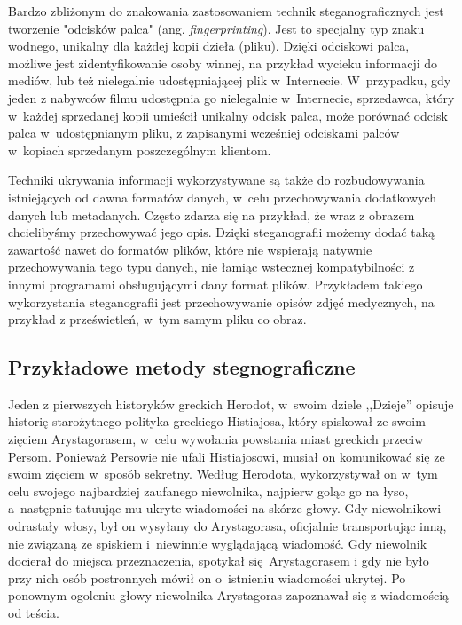\documentclass[a4paper, twoside, 12pt]{report}
\begin{document}
        Bardzo zbliżonym do znakowania zastosowaniem technik steganograficznych jest
        tworzenie "odcisków palca" (ang. \emph{fingerprinting}). Jest to specjalny
        typ znaku wodnego, unikalny dla każdej kopii dzieła (pliku). Dzięki odciskowi
        palca, możliwe jest zidentyfikowanie osoby winnej, na przykład wycieku informacji
        do mediów, lub też nielegalnie udostępniającej plik w~Internecie. W~przypadku,
        gdy jeden z nabywców filmu udostępnia go nielegalnie w~Internecie, sprzedawca,
        który w~każdej sprzedanej kopii umieścił unikalny odcisk palca, może porównać
        odcisk palca w~udostępnianym pliku, z zapisanymi wcześniej odciskami palców
        w~kopiach sprzedanym poszczególnym klientom.

        Techniki ukrywania informacji wykorzystywane są także do rozbudowywania
        istniejących od dawna formatów danych, w~celu przechowywania dodatkowych
        danych lub metadanych. Często zdarza się na przykład, że wraz z obrazem
        chcielibyśmy przechowywać jego opis. Dzięki steganografii możemy dodać
        taką zawartość nawet do formatów plików, które nie wspierają natywnie
        przechowywania tego typu danych, nie łamiąc wstecznej kompatybilności z innymi
        programami obsługującymi dany format plików. Przykładem takiego wykorzystania
        steganografii jest przechowywanie opisów zdjęć medycznych, na przykład
        z prześwietleń, w~tym samym pliku co obraz.\cite{DISAPPEARINGCRYPTOEMBEDDINGMETDATA}

        \subsection{Przykładowe metody stegnograficzne}
        Jeden z pierwszych historyków greckich Herodot, w~swoim dziele ,,Dzieje''
        opisuje historię starożytnego polityka greckiego Histiajosa, który spiskował
        ze swoim zięciem Arystagorasem, w~celu wywołania powstania miast greckich
        przeciw Persom\cite{STEGANOGRAPHYINTRO}. Ponieważ Persowie nie ufali Histiajosowi, musiał on komunikować
        się ze swoim zięciem w~sposób sekretny. Według Herodota, wykorzystywał
        on w~tym celu swojego najbardziej zaufanego niewolnika, najpierw goląc
        go na łyso, a~następnie tatuując mu ukryte wiadomości na skórze głowy.
        Gdy niewolnikowi odrastały włosy, był on wysyłany do Arystagorasa, oficjalnie
        transportując inną, nie związaną ze spiskiem i~niewinnie wyglądającą wiadomość.
        Gdy niewolnik docierał do miejsca przeznaczenia, spotykał się Arystagorasem i
        gdy nie było przy nich osób postronnych mówił on o~istnieniu wiadomości ukrytej.
        Po ponownym ogoleniu głowy niewolnika Arystagoras zapoznawał się z wiadomością
        od teścia.
\end{document}
